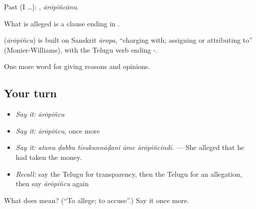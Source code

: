 Past (I …): , \emph{ārōpiñcānu}.

What is alleged is a clause ending in .

\begin{cousinweb}
\textbf{} (\emph{ārōpiñcu}) is built on Sanskrit \emph{āropa}, \textquotedblleft{}charging with; assigning or attributing to\textquotedblright{} (Monier-Williams), with the Telugu verb ending -.
\end{cousinweb}

\begin{grammarlens}[title={What you've built}]
One more word for giving reasons and opinions.
\end{grammarlens}

\subsection*{Your turn}
\begin{itemize}
\raggedright
  \item \emph{Say it:} \emph{ārōpiñcu}
  \item \emph{Say it:} \emph{ārōpiñcu}, once more
  \item \emph{Say it:} \emph{atanu ḍabbu tīsukunnāḍani āme ārōpiñcindi.} — She alleged that he had taken the money.
  \item \emph{Recall:} say the Telugu for transparency, then the Telugu for an allegation, then say \emph{ārōpiñcu} again
\end{itemize}

\begin{tcolorbox}[breakable,colback=teal!4,colframe=teal!35!black,title={Before you move on}]
What does  mean? (\textquotedblleft{}To allege; to accuse\textquotedblright{}.) Say it once more.
\end{tcolorbox}
